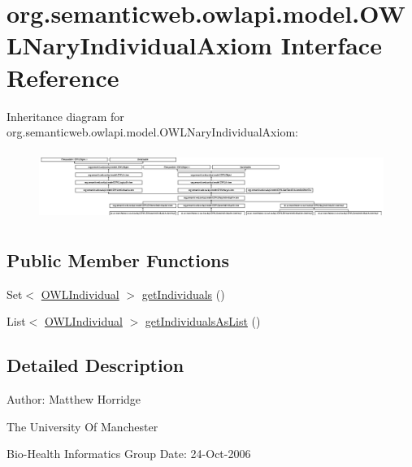 \hypertarget{interfaceorg_1_1semanticweb_1_1owlapi_1_1model_1_1_o_w_l_nary_individual_axiom}{\section{org.\-semanticweb.\-owlapi.\-model.\-O\-W\-L\-Nary\-Individual\-Axiom Interface Reference}
\label{interfaceorg_1_1semanticweb_1_1owlapi_1_1model_1_1_o_w_l_nary_individual_axiom}
}
Inheritance diagram for org.\-semanticweb.\-owlapi.\-model.\-O\-W\-L\-Nary\-Individual\-Axiom\-:\begin{figure}[H]
\begin{center}
\leavevmode
\includegraphics[height=2.256927cm]{interfaceorg_1_1semanticweb_1_1owlapi_1_1model_1_1_o_w_l_nary_individual_axiom}
\end{center}
\end{figure}
\subsection*{Public Member Functions}
\begin{DoxyCompactItemize}
\item 
Set$<$ \hyperlink{interfaceorg_1_1semanticweb_1_1owlapi_1_1model_1_1_o_w_l_individual}{O\-W\-L\-Individual} $>$ \hyperlink{interfaceorg_1_1semanticweb_1_1owlapi_1_1model_1_1_o_w_l_nary_individual_axiom_aead7181e31e3216cfa53651edc6fdf64}{get\-Individuals} ()
\item 
List$<$ \hyperlink{interfaceorg_1_1semanticweb_1_1owlapi_1_1model_1_1_o_w_l_individual}{O\-W\-L\-Individual} $>$ \hyperlink{interfaceorg_1_1semanticweb_1_1owlapi_1_1model_1_1_o_w_l_nary_individual_axiom_af2d7c54963955158f1a531da7b67008e}{get\-Individuals\-As\-List} ()
\end{DoxyCompactItemize}


\subsection{Detailed Description}
Author\-: Matthew Horridge\par
 The University Of Manchester\par
 Bio-\/\-Health Informatics Group Date\-: 24-\/\-Oct-\/2006 

